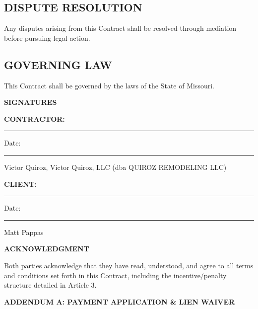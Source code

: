 \documentclass[10pt,letterpaper]{article}
\begin{document}
\subsection{DISPUTE RESOLUTION}
Any disputes arising from this Contract shall be resolved through mediation before pursuing legal action.

\subsection{GOVERNING LAW}
This Contract shall be governed by the laws of the State of Missouri.

\vspace{1em}

\noindent\textbf{SIGNATURES}

\vspace{1em}

\noindent\textbf{CONTRACTOR:}

\vspace{1.5em}
\noindent\rule{7cm}{0.4pt} \hspace{0.5cm} Date: \rule{2.5cm}{0.4pt}

\noindent Victor Quiroz, Victor Quiroz, LLC (dba QUIROZ REMODELING LLC)

\vspace{2em}

\noindent\textbf{CLIENT:}

\vspace{1.5em}
\noindent\rule{7cm}{0.4pt} \hspace{0.5cm} Date: \rule{2.5cm}{0.4pt}

\noindent Matt Pappas

\vspace{2em}

\noindent\textbf{ACKNOWLEDGMENT}

\vspace{0.5em}
\noindent Both parties acknowledge that they have read, understood, and agree to all terms and conditions set forth in this Contract, including the incentive/penalty structure detailed in Article 3.

\newpage

\begin{center}
{\large\bfseries ADDENDUM A: PAYMENT APPLICATION \& LIEN WAIVER}
\end{center}

\vspace{0.5em}

\end{document}
